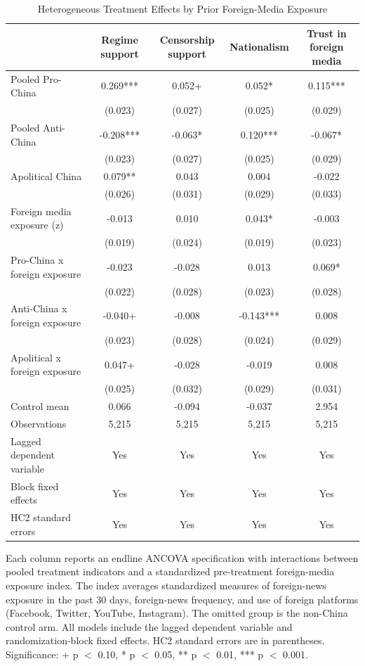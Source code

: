 \begin{table}[H]
\centering
\caption{Heterogeneous Treatment Effects by Prior Foreign-Media Exposure}
\label{tab:het_foreign_t1}
\footnotesize
\begin{threeparttable}
\begin{tabular}{lcccc}
\toprule
 & Regime support & Censorship support & Nationalism & Trust in foreign media \\
\midrule
Pooled Pro-China & 0.269*** & 0.052+ & 0.052* & 0.115*** \\
 & (0.023) & (0.027) & (0.025) & (0.029) \\
\addlinespace
Pooled Anti-China & -0.208*** & -0.063* & 0.120*** & -0.067* \\
 & (0.023) & (0.027) & (0.025) & (0.029) \\
\addlinespace
Apolitical China & 0.079** & 0.043 & 0.004 & -0.022 \\
 & (0.026) & (0.031) & (0.029) & (0.033) \\
\addlinespace
Foreign media exposure (z) & -0.013 & 0.010 & 0.043* & -0.003 \\
 & (0.019) & (0.024) & (0.019) & (0.023) \\
\addlinespace
Pro-China x foreign exposure & -0.023 & -0.028 & 0.013 & 0.069* \\
 & (0.022) & (0.028) & (0.023) & (0.028) \\
\addlinespace
Anti-China x foreign exposure & -0.040+ & -0.008 & -0.143*** & 0.008 \\
 & (0.023) & (0.028) & (0.024) & (0.029) \\
\addlinespace
Apolitical x foreign exposure & 0.047+ & -0.028 & -0.019 & 0.008 \\
 & (0.025) & (0.032) & (0.029) & (0.031) \\
\addlinespace
\midrule
Control mean & 0.066 & -0.094 & -0.037 & 2.954 \\
Observations & 5,215 & 5,215 & 5,215 & 5,215 \\
Lagged dependent variable & Yes & Yes & Yes & Yes \\
Block fixed effects & Yes & Yes & Yes & Yes \\
HC2 standard errors & Yes & Yes & Yes & Yes \\
\bottomrule
\end{tabular}
\begin{tablenotes}[flushleft]
\footnotesize
\item Each column reports an endline ANCOVA specification with interactions between pooled treatment indicators and a standardized pre-treatment foreign-media exposure index. The index averages standardized measures of foreign-news exposure in the past 30 days, foreign-news frequency, and use of foreign platforms (Facebook, Twitter, YouTube, Instagram). The omitted group is the non-China control arm. All models include the lagged dependent variable and randomization-block fixed effects. HC2 standard errors are in parentheses. Significance: + p $<$ 0.10, * p $<$ 0.05, ** p $<$ 0.01, *** p $<$ 0.001.
\end{tablenotes}
\end{threeparttable}
\end{table}
